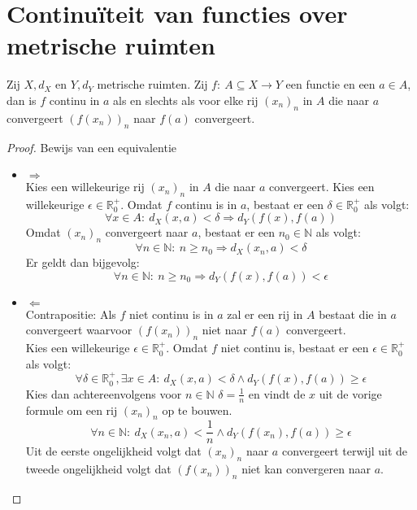 \documentclass[main.tex]{subfiles}
\begin{document}
\chapter{Continu\"iteit van functies over metrische ruimten}
\label{cha:continuiteit-van-functies-over-metrische-ruimten}

\begin{bpr}
  \label{pr:continuiteit-itv-rijen}
  Zij $X,d_{X}$ en $Y,d_{Y}$ metrische ruimten.
  Zij $f:\ A \subseteq X \rightarrow Y$ een functie en een $a\in A$, dan is $f$ continu in $a$ als en slechts als voor elke rij $(x_{n})_{n}$ in $A$ die naar $a$ convergeert $(f(x_{n}))_{n}$ naar $f(a)$ convergeert.

  \begin{proof}
    Bewijs van een equivalentie
    \begin{itemize}
    \item $\Rightarrow$\\
      Kies een willekeurige rij $(x_{n})_{n}$ in $A$ die naar $a$ convergeert.
      Kies een willekeurige $\epsilon\in\mathbb{R}_{0}^{+}$.
      Omdat $f$ continu is in $a$, bestaat er een $\delta\in \mathbb{R}_{0}^{+}$ als volgt:
      \[ \forall x\in A:\ d_{X}(x,a) < \delta \Rightarrow d_{Y}(f(x),f(a)) \]
      Omdat $(x_{n})_{n}$ convergeert naar $a$, bestaat er een $n_{0}\in \mathbb{N}$ als volgt:
      \[ \forall n\in \mathbb{N}:\ n \ge n_{0} \Rightarrow  d_{X}(x_{n},a) < \delta \]
      Er geldt dan bijgevolg:
      \[ \forall n\in \mathbb{N}:\ n \ge n_{0} \Rightarrow d_{Y}(f(x),f(a)) < \epsilon \]
    \item $\Leftarrow$\\
      Contrapositie: Als $f$ niet continu is in $a$ zal er een rij in $A$ bestaat die in $a$ convergeert waarvoor $(f(x_{n}))_{n}$ niet naar $f(a)$ convergeert.\\
      Kies een willekeurige $\epsilon\in\mathbb{R}_{0}^{+}$.
      Omdat $f$ niet continu is, bestaat er een $\epsilon \in \mathbb{R}_{0}^{+}$ als volgt:
      \[ \forall \delta \in \mathbb{R}_{0}^{+}, \exists x\in A:\ d_{X}(x,a) < \delta \wedge d_{Y}(f(x),f(a)) \ge \epsilon \]
      Kies dan achtereenvolgens voor $n\in \mathbb{N}$ $\delta = \frac{1}{n}$ en vindt de $x$ uit de vorige formule om een rij $(x_{n})_{n}$ op te bouwen.
      \[ \forall n\in \mathbb{N}:\ d_{X}(x_{n},a) < \frac{1}{n} \wedge d_{Y}(f(x_{n}),f(a)) \ge \epsilon \]
      Uit de eerste ongelijkheid volgt dat $(x_{n})_{n}$ naar $a$ convergeert terwijl uit de tweede ongelijkheid volgt dat $(f(x_{n}))_{n}$ niet kan convergeren naar $a$.
    \end{itemize}
  \end{proof}
\end{bpr}
\end{document}
